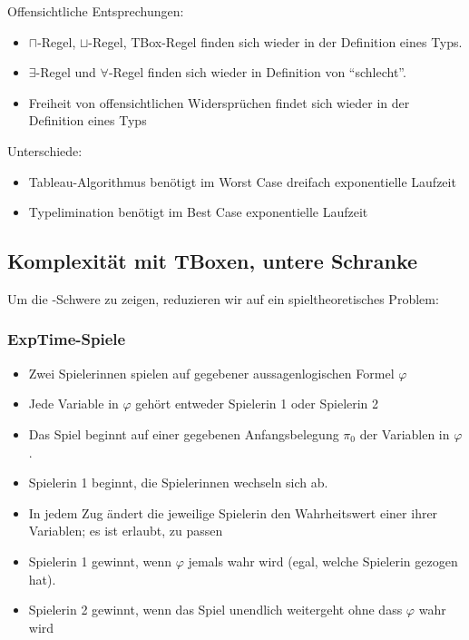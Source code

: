 Offensichtliche Entsprechungen:

\begin{itemize}
  \item $\sqcap$-Regel, $\sqcup$-Regel, TBox-Regel finden sich wieder in der Definition eines Typs.
  \item $\exists$-Regel und $\forall$-Regel finden sich wieder in Definition von \enquote{schlecht}.
  \item Freiheit von offensichtlichen Widersprüchen findet sich wieder in der Definition eines Typs
\end{itemize}

Unterschiede:

\begin{itemize}
  \item Tableau-Algorithmus benötigt im Worst Case dreifach exponentielle Laufzeit
  \item Typelimination benötigt im Best Case exponentielle Laufzeit
\end{itemize}

\subsection{Komplexität mit TBoxen, untere Schranke}\label{komplexituxe4t-mit-tboxen-untere-schranke}

Um die \ExpTime-Schwere zu zeigen, reduzieren wir auf ein spieltheoretisches Problem:

\subsubsection{ExpTime-Spiele}\label{exptime-spiele}

\begin{itemize}
\item Zwei Spielerinnen spielen auf gegebener aussagenlogischen Formel $\varphi$
\item Jede Variable in $\varphi$ gehört entweder Spielerin 1 oder Spielerin 2
\item Das Spiel beginnt auf einer gegebenen Anfangsbelegung $\pi_0$ der Variablen in $\varphi$.
\item Spielerin 1 beginnt, die Spielerinnen wechseln sich ab.
\item In jedem Zug ändert die jeweilige Spielerin den Wahrheitswert einer ihrer Variablen; es ist erlaubt, zu passen
\item Spielerin 1 gewinnt, wenn $\varphi$ jemals wahr wird (egal, welche Spielerin gezogen hat).
\item Spielerin 2 gewinnt, wenn das Spiel unendlich weitergeht ohne dass $\varphi$ wahr wird
\end{itemize}

